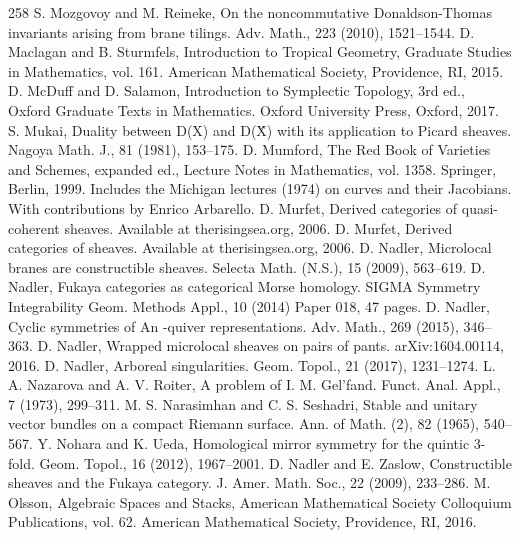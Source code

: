 \begin{thebibliography}{258}
\hypertarget{ref:180}{} S. Mozgovoy and M. Reineke, On the noncommutative Donaldson-Thomas invariants arising from brane tilings. Adv. Math., 223 (2010), 1521–1544.
\hypertarget{ref:181}{} D. Maclagan and B. Sturmfels, Introduction to Tropical Geometry, Graduate Studies in Mathematics, vol. 161. American Mathematical Society, Providence, RI, 2015.
\hypertarget{ref:182}{} D. McDuff and D. Salamon, Introduction to Symplectic Topology, 3rd ed., Oxford Graduate Texts in Mathematics. Oxford University Press, Oxford, 2017.
\hypertarget{ref:183}{} S. Mukai, Duality between D(X) and D(X̂) with its application to Picard sheaves. Nagoya Math. J., 81 (1981), 153–175.
\hypertarget{ref:184}{} D. Mumford, The Red Book of Varieties and Schemes, expanded ed., Lecture Notes in Mathematics, vol. 1358. Springer, Berlin, 1999. Includes the Michigan lectures (1974) on curves and their Jacobians. With contributions by Enrico Arbarello.
\hypertarget{ref:185}{} D. Murfet, Derived categories of quasi-coherent sheaves. Available at therisingsea.org, 2006.
\hypertarget{ref:186}{} D. Murfet, Derived categories of sheaves. Available at therisingsea.org, 2006.
\hypertarget{ref:187}{} D. Nadler, Microlocal branes are constructible sheaves. Selecta Math. (N.S.), 15 (2009), 563–619.
\hypertarget{ref:188}{} D. Nadler, Fukaya categories as categorical Morse homology. SIGMA Symmetry Integrability Geom. Methods Appl., 10 (2014) Paper 018, 47 pages.
\hypertarget{ref:189}{} D. Nadler, Cyclic symmetries of An -quiver representations. Adv. Math., 269 (2015), 346–363.
\hypertarget{ref:190}{} D. Nadler, Wrapped microlocal sheaves on pairs of pants. arXiv:1604.00114, 2016.
\hypertarget{ref:191}{} D. Nadler, Arboreal singularities. Geom. Topol., 21 (2017), 1231–1274.
\hypertarget{ref:192}{} L. A. Nazarova and A. V. Roiter, A problem of I. M. Gel’fand. Funct. Anal. Appl., 7 (1973), 299–311.
\hypertarget{ref:193}{} M. S. Narasimhan and C. S. Seshadri, Stable and unitary vector bundles on a compact Riemann surface. Ann. of Math. (2), 82 (1965), 540–567.
\hypertarget{ref:194}{} Y. Nohara and K. Ueda, Homological mirror symmetry for the quintic 3-fold. Geom. Topol., 16 (2012), 1967–2001.
\hypertarget{ref:195}{} D. Nadler and E. Zaslow, Constructible sheaves and the Fukaya category. J. Amer. Math. Soc., 22 (2009), 233–286.
\hypertarget{ref:196}{} M. Olsson, Algebraic Spaces and Stacks, American Mathematical Society Colloquium Publications, vol. 62. American Mathematical Society, Providence, RI, 2016.

\end{thebibliography}
